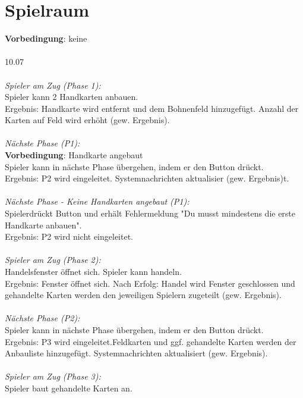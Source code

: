 \documentclass[10pt]{report}
\begin{document}
	\chapter{Spielraum}
		\textbf{Vorbedingung}: keine \\
		\\
		10.07 \\
		\\
		\textsl{Spieler am Zug (Phase 1):} \\
		Spieler kann 2 Handkarten anbauen.  \\
		Ergebnis: Handkarte wird entfernt und dem Bohnenfeld hinzugef\"ugt. Anzahl der Karten auf Feld 				wird erh\"oht (gew. Ergebnis). \\
		\\
		\textsl{Nächste Phase (P1):} \\
		\textbf{Vorbedingung}: Handkarte angebaut \\
		Spieler kann in nächste Phase übergehen, indem er den Button drückt.  \\
		Ergebnis: P2 wird eingeleitet. Systemnachrichten aktualisier (gew. Ergebnis)t. \\
		\\
		\textsl{Nächste Phase - Keine Handkarten angebaut (P1):} \\
		Spielerdrückt Button und erhält Fehlermeldung "Du musst mindestens die erste Handkarte anbauen".  \\
		Ergebnis: P2 wird nicht eingeleitet. \\
		\\
		\textsl{Spieler am Zug (Phase 2):} \\
		Handelsfenster \"offnet sich. Spieler kann handeln. \\
		Ergebnis: Fenster \"offnet sich. Nach Erfolg: Handel wird Fenster geschlossen und gehandelte Karten 		werden den jeweiligen Spielern zugeteilt (gew. Ergebnis). \\
		\\
		\textsl{Nächste Phase (P2):} \\
		Spieler kann in nächste Phase übergehen, indem er den Button drückt.  \\
		Ergebnis: P3 wird eingeleitet.Feldkarten und ggf. gehandelte Karten werden der Anbauliste hinzugefügt. Systemnachrichten aktualisiert (gew. Ergebnis). \\
		\\
		\textsl{Spieler am Zug (Phase 3):} \\
		Spieler baut gehandelte Karten an. \\
\end{document}
